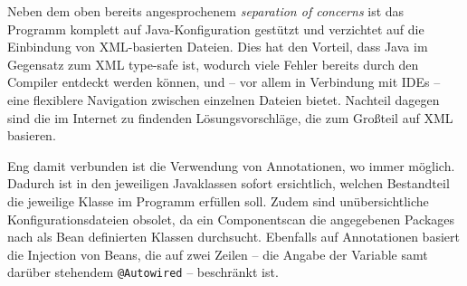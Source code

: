 Neben dem oben bereits angesprochenem \textit{separation of concerns} ist das Programm komplett auf Java-Konfiguration gestützt und verzichtet auf die Einbindung von XML-basierten Dateien. Dies hat den Vorteil, dass Java im Gegensatz zum XML type-safe ist, wodurch viele Fehler bereits durch den Compiler entdeckt werden können, und -- vor allem in Verbindung mit IDEs -- eine flexiblere Navigation zwischen einzelnen Dateien bietet. Nachteil dagegen sind die im Internet zu findenden Lösungsvorschläge, die zum Großteil auf XML basieren.

Eng damit verbunden ist die Verwendung von Annotationen, wo immer möglich. Dadurch ist in den jeweiligen Javaklassen sofort ersichtlich, welchen Bestandteil die jeweilige Klasse im Programm erfüllen soll. Zudem sind unübersichtliche Konfigurationsdateien obsolet, da ein Componentscan die angegebenen Packages nach als Bean definierten Klassen durchsucht. Ebenfalls auf Annotationen basiert die Injection von Beans, die auf zwei Zeilen -- die Angabe der Variable samt darüber stehendem \texttt{@Autowired} -- beschränkt ist.